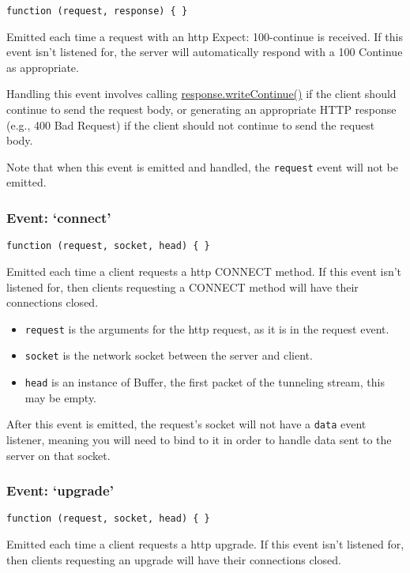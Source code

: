 \texttt{function (request, response) \{ \}}

Emitted each time a request with an http Expect: 100-continue is
received. If this event isn't listened for, the server will
automatically respond with a 100 Continue as appropriate.

Handling this event involves calling
\hyperref[httpux5fresponseux5fwritecontinue]{response.writeContinue()}
if the client should continue to send the request body, or generating an
appropriate HTTP response (e.g., 400 Bad Request) if the client should
not continue to send the request body.

Note that when this event is emitted and handled, the \texttt{request}
event will not be emitted.

\subsubsection{Event: `connect'}\label{event-connect}

\texttt{function (request, socket, head) \{ \}}

Emitted each time a client requests a http CONNECT method. If this event
isn't listened for, then clients requesting a CONNECT method will have
their connections closed.

\begin{itemize}
\itemsep1pt\parskip0pt
\item
  \texttt{request} is the arguments for the http request, as it is in
  the request event.
\item
  \texttt{socket} is the network socket between the server and client.
\item
  \texttt{head} is an instance of Buffer, the first packet of the
  tunneling stream, this may be empty.
\end{itemize}

After this event is emitted, the request's socket will not have a
\texttt{data} event listener, meaning you will need to bind to it in
order to handle data sent to the server on that socket.

\subsubsection{Event: `upgrade'}\label{event-upgrade}

\texttt{function (request, socket, head) \{ \}}

Emitted each time a client requests a http upgrade. If this event isn't
listened for, then clients requesting an upgrade will have their
connections closed.

